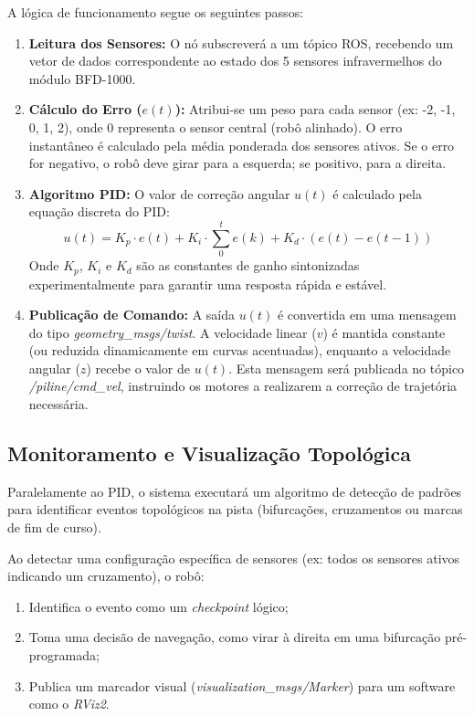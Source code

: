 A lógica de funcionamento segue os seguintes passos:

\begin{enumerate}
    \item \textbf{Leitura dos Sensores:} O nó subscreverá a um tópico ROS, recebendo um vetor de dados correspondente ao estado dos 5 sensores infravermelhos do módulo BFD-1000.
    
    \item \textbf{Cálculo do Erro ($e(t)$):} Atribui-se um peso para cada sensor (ex: -2, -1, 0, 1, 2), onde 0 representa o sensor central (robô alinhado). O erro instantâneo é calculado pela média ponderada dos sensores ativos. Se o erro for negativo, o robô deve girar para a esquerda; se positivo, para a direita.
    
    \item \textbf{Algoritmo PID:} O valor de correção angular $u(t)$ é calculado pela equação discreta do PID:
    \begin{equation}
        u(t) = K_p \cdot e(t) + K_i \cdot \sum_{0}^{t} e(k) + K_d \cdot (e(t) - e(t-1))
    \end{equation}
    Onde $K_p$, $K_i$ e $K_d$ são as constantes de ganho sintonizadas experimentalmente para garantir uma resposta rápida e estável.
    
    \item \textbf{Publicação de Comando:} A saída $u(t)$ é convertida em uma mensagem do tipo \textit{geometry\_msgs/twist}. A velocidade linear ($v$) é mantida constante (ou reduzida dinamicamente em curvas acentuadas), enquanto a velocidade angular ($z$) recebe o valor de $u(t)$. Esta mensagem será publicada no tópico \textit{/piline/cmd\_vel}, instruindo os motores a realizarem a correção de trajetória necessária.
\end{enumerate}

\subsection{Monitoramento e Visualização Topológica}
Paralelamente ao PID, o sistema executará um algoritmo de detecção de padrões para identificar eventos topológicos na pista (bifurcações, cruzamentos ou marcas de fim de curso).

Ao detectar uma configuração específica de sensores (ex: todos os sensores ativos indicando um cruzamento), o robô:
\begin{enumerate}
    \item Identifica o evento como um \textit{checkpoint} lógico;
    \item Toma uma decisão de navegação, como virar à direita em uma bifurcação pré-programada;
    \item Publica um marcador visual (\textit{visualization\_msgs/Marker}) para um software como o \textit{RViz2}.
\end{enumerate}

